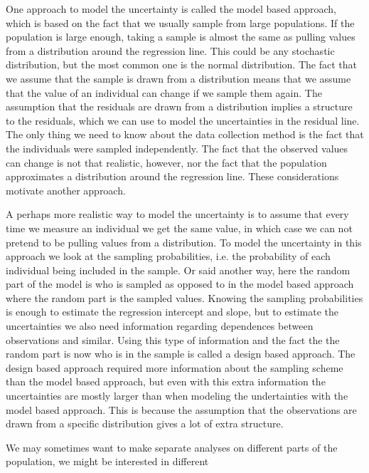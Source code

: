 \documentclass{article}
\begin{document}
One approach to model the uncertainty is called the model based approach, which
is based on the fact that we usually sample from large populations. If the
population is large enough, taking a sample is almost the same as pulling
values from a distribution around the regression line. This could be any stochastic distribution, but the most
common one is the normal distribution. The fact that we assume that the
sample is drawn from a distribution means that we assume that the value of an
individual can change if we sample them again. The assumption that the residuals
are drawn from a distribution implies a structure to the residuals, which we
can use to model the uncertainties in the residual line. The only thing we need
to know about the data collection method is the fact that the individuals were
sampled independently. The fact that the observed values can change is not that
realistic, however, nor the fact that the population approximates a
distribution around the regression line. These considerations
motivate another approach.

A perhaps more realistic way to model the uncertainty is to assume that every time we measure an
individual we get the same value, in which case we can not pretend to be pulling
values from a distribution. To model the uncertainty in this approach we look at
the sampling probabilities, i.e. the probability of each individual being
included in the sample. Or said another way, here the random part of the model
is who is sampled as opposed to in the model based approach where the random
part is the sampled values. Knowing the sampling probabilities is enough to
estimate the regression intercept and slope, but to estimate the uncertainties
we also need information regarding dependences between observations and similar.
Using this type of information and the fact the the random part is now who is in
the sample is called a design based approach. The design based approach required
more information about the sampling scheme than the model based approach, but
even with this extra information the uncertainties are mostly larger than when
modeling the undertainties with the model based approach. This is because the
assumption that the observations are drawn from a specific distribution gives a
lot of extra structure.

We may sometimes want to make separate analyses on different parts of the
population, we might be interested in different
\end{document}
